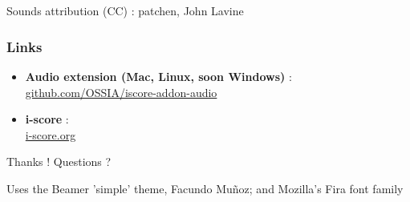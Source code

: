 \documentclass{beamer}
\begin{document}
\begin{frame}[allowframebreaks]%
    
    
    
    {\footnotesize
        \nocite{*}
        
        
    }
    ~\\~\\
    Sounds attribution (CC) : patchen, John Lavine
\end{frame}

\begin{frame}
    \frametitle{Links} 
    \Large
    \begin{itemize}
        \setlength\itemsep{1em}
        \item \textbf{Audio extension ({\unicodefun Mac, Linux, soon Windows})} :~\\
        \url{github.com/OSSIA/iscore-addon-audio} 
        \item \textbf{i-score} :~\\
         \url{i-score.org}
    \end{itemize}
        
    \centering
    \vspace{2em}
    \Large{Thanks ! Questions ?}
    \vspace{2em}
    
    \tiny{Uses the Beamer 'simple' theme, Facundo Muñoz; and Mozilla's Fira font family}
\end{frame}
\end{document}
